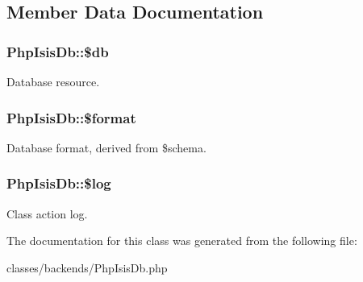 \subsection{Member Data Documentation}
\hypertarget{classPhpIsisDb_a536e4c67dda71a7c7dad9ffbac299f9b}{
\subsubsection[{\$db}]{\setlength{\rightskip}{0pt plus 5cm}PhpIsisDb::\$db}}
\label{classPhpIsisDb_a536e4c67dda71a7c7dad9ffbac299f9b}
Database resource. \hypertarget{classPhpIsisDb_a275e29f3711d37fc67cea340b564ddf3}{
\subsubsection[{\$format}]{\setlength{\rightskip}{0pt plus 5cm}PhpIsisDb::\$format}}
\label{classPhpIsisDb_a275e29f3711d37fc67cea340b564ddf3}
Database format, derived from \$schema. \hypertarget{classPhpIsisDb_a0742105b3efab477fda99cd0561f98c7}{
\subsubsection[{\$log}]{\setlength{\rightskip}{0pt plus 5cm}PhpIsisDb::\$log}}
\label{classPhpIsisDb_a0742105b3efab477fda99cd0561f98c7}
Class action log. 

The documentation for this class was generated from the following file:\begin{DoxyCompactItemize}
\item 
classes/backends/PhpIsisDb.php\end{DoxyCompactItemize}
